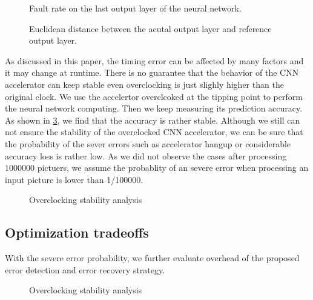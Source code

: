 \begin{figure}
    \caption{Fault rate on the last output layer of the neural network.}
\label{fig:cuowulv}
\vspace{-1em}
\end{figure}

\begin{figure}
    \caption{Euclidean distance between the acutal output layer and reference output layer.}
\label{fig:oushijuli}
\vspace{-1em}
\end{figure}

As discussed in this paper, the timing error can be affected by many factors and it may change 
at runtime. There is no guarantee that the behavior of the CNN accelerator can keep stable even 
overclocking is just slighly higher than the original clock. We use the accelertor overclcoked at the 
tipping point to perform the neural network computing. Then we keep measuring its 
prediction accuracy. As shown in \ref{fig:stability}, we find that the accuracy is rather stable.
Although we still can not ensure the stability of the overclocked CNN accelerator, we can 
be sure that the probability of the sever errors such as accelerator hangup or considerable 
accuracy loss is rather low. As we did not observe the cases after processing 1000000 pictuers, 
we assume the probablity of an severe error when processing an input picture is lower than 1/100000.
\begin{figure}
    \caption{Overclocking stability analysis}
\label{fig:stability}
\vspace{-1em}
\end{figure}


\subsection{Optimization tradeoffs}
With the severe error probability, we further evaluate overhead of 
the proposed error detection and error recovery strategy.

\begin{figure}
    \caption{Overclocking stability analysis}
\label{fig:time_consume}
\vspace{-1em}
\end{figure}


